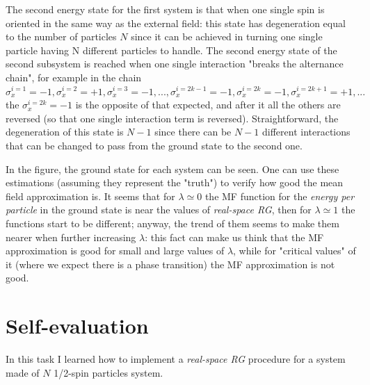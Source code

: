\documentclass[12pt, a4paper, notitlepage]{report}
\begin{document}
The second energy state for the first system is that when one single spin is oriented in the same way as the external field: this state has degeneration equal to the number of particles $N$ since it can be achieved in turning one single particle having N different particles to handle. The second energy state of the second subsystem is reached when one single interaction "breaks the alternance chain", for example in the chain $\sigma_x^{i=1} = -1, \sigma_x^{i=2} = +1, \sigma_x^{i=3} = -1, ... , \sigma_x^{i=2k-1} = -1, \sigma_x^{i=2k} = -1, \sigma_x^{i=2k+1} = +1, ...$ the $\sigma_x^{i=2k} = -1$ is the opposite of that expected, and after it all the others are reversed (so that one single interaction term is reversed). Straightforward, the degeneration of this state is $N-1$ since there can be $N-1$ different interactions that can be changed to pass from the ground state to the second one.


In the figure, the ground state for each system can be seen. One can use these estimations (assuming they represent the "truth") to verify how good the mean field approximation is. It seems that for $\lambda \simeq 0$ the MF function for the \textit{energy per particle} in the ground state is near the values of \textit{real-space RG}, then for $\lambda \simeq 1$ the functions start to be different; anyway, the trend of them seems to make them nearer when further increasing $\lambda$: this fact can make us think that the MF approximation is good for small and large values of $\lambda$, while for "critical values" of it (where we expect there is a phase transition) the MF approximation is not good.

\section*{Self-evaluation}
In this task I learned how to implement a \textit{real-space RG} procedure for a system made of $N$ 1/2-spin particles system.
\end{document}
